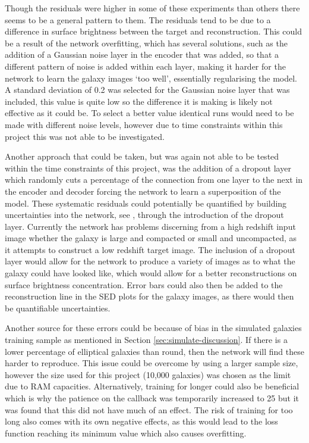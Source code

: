 \documentclass[fleqn,usenatbib]{mnras}
\begin{document}
Though the residuals were higher in some of these experiments than others there seems to be a general pattern to them. The residuals tend to be due to a difference in surface brightness between the target and reconstruction. This could be a result of the network overfitting, which has several solutions, such as the addition of a Gaussian noise layer in the encoder that was added, so that a different pattern of noise is added within each layer, making it harder for the network to learn the galaxy images ‘too well', essentially regularising the model. A standard deviation of 0.2 was selected for the Gaussian noise layer that was included, this value is quite low so the difference it is making is likely not effective as it could be. To select a better value identical runs would need to be made with different noise levels, however due to time constraints within this project this was not able to be investigated.

Another approach that could be taken, but was again not able to be tested within the time constraints of this project, was the addition of a dropout layer which randomly cuts a percentage of the connection from one layer to the next in the encoder and decoder forcing the network to learn a superposition of the model. These systematic residuals could potentially be quantified by building uncertainties into the network, see \citet{Perreault2017, Pearson2021}, through the introduction of the dropout layer. Currently the network has problems discerning from a high redshift input image whether the galaxy is large and compacted or small and uncompacted, as it attempts to construct a low redshift target image. The inclusion of a dropout layer would allow for the network to produce a variety of images as to what the galaxy could have looked like, which would allow for a better reconstructions on surface brightness concentration. Error bars could also then be added to the reconstruction line in the SED plots for the galaxy images, as there would then be quantifiable uncertainties.

Another source for these errors could be because of bias in the simulated galaxies training sample as mentioned in Section \ref{sec:simulate-discussion}. If there is a lower percentage of elliptical galaxies than round, then the network will find these harder to reproduce. This issue could be overcome by using a larger sample size, however the size used for this project (10,000 galaxies) was chosen as the limit due to RAM capacities. Alternatively, training for longer could also be beneficial which is why the patience on the callback was temporarily increased to 25 but it was found that this did not have much of an effect. The risk of training for too long also comes with its own negative effects, as this would lead to the loss function reaching its minimum value which also causes overfitting.
\end{document}
